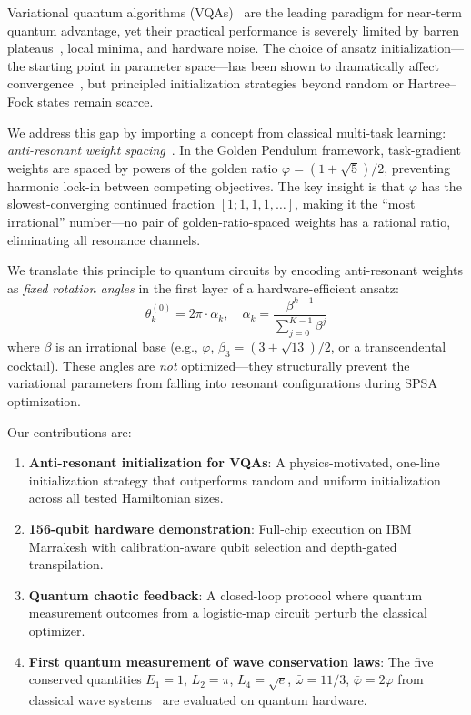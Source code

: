 \documentclass[twocolumn,showpacs,preprintnumbers,amsmath,amssymb,aps,prl]{revtex4-2}
\begin{document}
Variational quantum algorithms (VQAs)~\cite{peruzzo2014variational,kandala2017hardware} are the leading paradigm for near-term quantum advantage, yet their practical performance is severely limited by barren plateaus~\cite{mcclean2018barren}, local minima, and hardware noise. The choice of ansatz initialization---the starting point in parameter space---has been shown to dramatically affect convergence~\cite{grant2019initialization}, but principled initialization strategies beyond random or Hartree--Fock states remain scarce.

We address this gap by importing a concept from classical multi-task learning: \emph{anti-resonant weight spacing}~\cite{knopp2026golden}. In the Golden Pendulum framework, task-gradient weights are spaced by powers of the golden ratio $\varphi = (1+\sqrt{5})/2$, preventing harmonic lock-in between competing objectives. The key insight is that $\varphi$ has the slowest-converging continued fraction $[1;1,1,1,\ldots]$, making it the ``most irrational'' number---no pair of golden-ratio-spaced weights has a rational ratio, eliminating all resonance channels.

We translate this principle to quantum circuits by encoding anti-resonant weights as \emph{fixed rotation angles} in the first layer of a hardware-efficient ansatz:
\begin{equation}
    \theta_k^{(0)} = 2\pi \cdot \alpha_k, \quad \alpha_k = \frac{\beta^{k-1}}{\sum_{j=0}^{K-1} \beta^j}
\end{equation}
where $\beta$ is an irrational base (e.g., $\varphi$, $\beta_3 = (3+\sqrt{13})/2$, or a transcendental cocktail). These angles are \emph{not} optimized---they structurally prevent the variational parameters from falling into resonant configurations during SPSA optimization.

Our contributions are:
\begin{enumerate}
    \item \textbf{Anti-resonant initialization for VQAs}: A physics-motivated, one-line initialization strategy that outperforms random and uniform initialization across all tested Hamiltonian sizes.
    \item \textbf{156-qubit hardware demonstration}: Full-chip execution on IBM Marrakesh with calibration-aware qubit selection and depth-gated transpilation.
    \item \textbf{Quantum chaotic feedback}: A closed-loop protocol where quantum measurement outcomes from a logistic-map circuit perturb the classical optimizer.
    \item \textbf{First quantum measurement of wave conservation laws}: The five conserved quantities $E_1\!=\!1$, $L_2\!=\!\pi$, $L_4\!=\!\sqrt{e}$, $\bar{\omega}\!=\!11/3$, $\bar{\varphi}\!=\!2\varphi$ from classical wave systems~\cite{knopp2026attractor} are evaluated on quantum hardware.
\end{enumerate}
\end{document}

